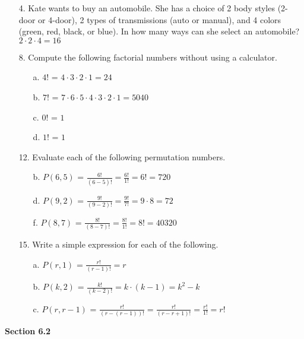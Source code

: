 \documentclass{article}
\begin{document}
\begin{itemize}
    \item[4.] Kate wants to buy an automobile. She has a choice of 2 body styles (2-door or 4-door), 2 types of transmissions (auto or manual), and 4 colors (green, red, black, or blue).  In how many ways can she select an automobile?\\ {\color{blue} $2\cdot2\cdot4=16$}
    \item[8.] Compute the following factorial numbers without using a calculator.
    \begin{itemize}
        \item[a.] $4!$ {\color{blue}= $4\cdot3\cdot2\cdot1=24$}
        \item[b.] $7!$ {\color{blue}= $7\cdot6\cdot5\cdot4\cdot3\cdot2\cdot1=5040$}
        \item[c.] $0!$ {\color{blue}= $1$}
        \item[d.] $1!$ {\color{blue}= $1$}
    \end{itemize}
    \item[12.] Evaluate each of the following permutation numbers.
    \begin{itemize}
        \item[b.] $P(6,5)$ {\color{blue}= $\frac{6!}{(6-5)!} = \frac{6!}{1!}=6!=720$}
        \item[d.] $P(9,2)$ {\color{blue}= $\frac{9!}{(9-2)!} = \frac{9!}{7!}=9\cdot8=72$}
        \item[f.] $P(8,7)$ {\color{blue}= $\frac{8!}{(8-7)!} = \frac{8!}{1!}=8!=40320$}
    \end{itemize}
    \item[15.] Write a simple expression for each of the following.
    \begin{itemize}
        \item[a.] $P(r,1)$ {\color{blue}= $\frac{r!}{(r-1)!}=r$}
        \item[b.] $P(k,2)$ {\color{blue}= $\frac{k!}{(k-2)!}=k\cdot(k-1)=k^2-k$}
        \item[c.] $P(r,r-1)$ {\color{blue}= $\frac{r!}{(r-(r-1))!}=\frac{r!}{(r-r+1)!}=\frac{r!}{1!}=r!$}
    \end{itemize}
\end{itemize}
\textbf{Section 6.2}
\end{document}
